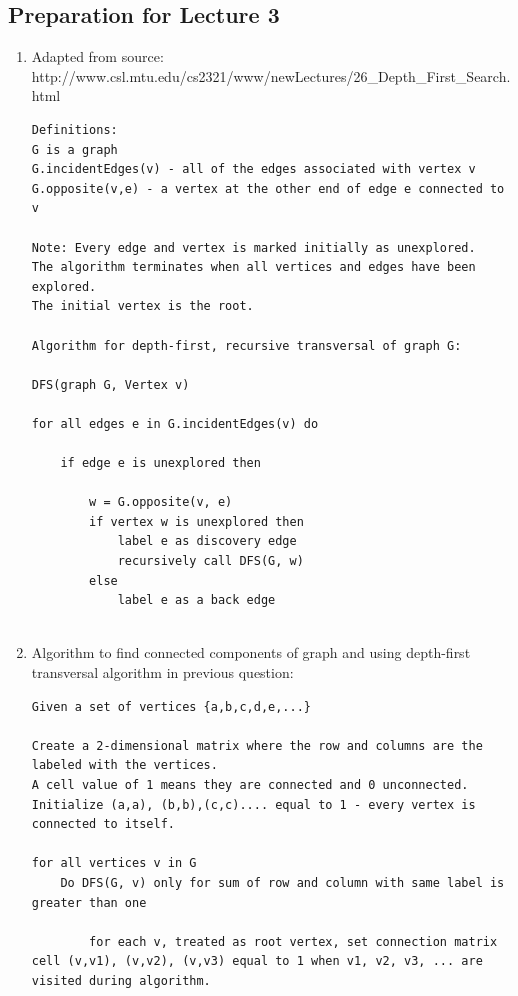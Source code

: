\documentclass{article}
\begin{document}
\subsection{Preparation for Lecture 3}
\begin{enumerate}
\item
Adapted from source: http://www.csl.mtu.edu/cs2321/www/newLectures/26_Depth_First_Search.html

\begin{lstlisting}
Definitions: 
G is a graph
G.incidentEdges(v) - all of the edges associated with vertex v
G.opposite(v,e) - a vertex at the other end of edge e connected to v

Note: Every edge and vertex is marked initially as unexplored.
The algorithm terminates when all vertices and edges have been explored.
The initial vertex is the root.

Algorithm for depth-first, recursive transversal of graph G:

DFS(graph G, Vertex v) 

for all edges e in G.incidentEdges(v) do

    if edge e is unexplored then
    
        w = G.opposite(v, e) 
        if vertex w is unexplored then 
            label e as discovery edge 
            recursively call DFS(G, w) 
        else 
            label e as a back edge
            
\end{lstlisting}

\item
Algorithm to find connected components of graph and using depth-first transversal algorithm in previous question:
\begin{lstlisting}
Given a set of vertices {a,b,c,d,e,...}

Create a 2-dimensional matrix where the row and columns are the labeled with the vertices.
A cell value of 1 means they are connected and 0 unconnected.
Initialize (a,a), (b,b),(c,c).... equal to 1 - every vertex is connected to itself.

for all vertices v in G
	Do DFS(G, v) only for sum of row and column with same label is greater than one
		
		for each v, treated as root vertex, set connection matrix cell (v,v1), (v,v2), (v,v3) equal to 1 when v1, v2, v3, ... are visited during algorithm. 	
\end{lstlisting}


\end{enumerate}
\end{document}
